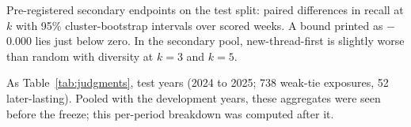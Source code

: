 \documentclass[11pt]{article}
\begin{document}
\begin{table}[h]
\centering
\small

\caption{Pre-registered secondary endpoints on the test split: paired differences in recall at $k$ with 95\% cluster-bootstrap intervals over scored weeks. A bound printed as $-$0.000 lies just below zero. In the secondary pool, new-thread-first is slightly worse than random with diversity at $k = 3$ and $k = 5$.}
\label{tab:secondary}
\end{table}

\begin{table}[h]
\centering
\small

\caption{As Table~\ref{tab:judgments}, test years (2024 to 2025; 738 weak-tie exposures, 52 later-lasting). Pooled with the development years, these aggregates were seen before the freeze; this per-period breakdown was computed after it.}
\label{tab:judgments_test}
\end{table}
\end{document}
